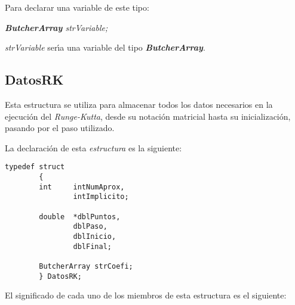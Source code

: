 Para declarar una variable de este tipo:
\begin{center}
\emph{\textbf{ButcherArray} strVariable;}
\end{center}

\emph{strVariable} ser\'{\i}a una variable del tipo 
\emph{\textbf{ButcherArray}}.

\newpage

\subsection{DatosRK} \label{sec:datosRK}

Esta estructura se utiliza para almacenar todos los datos necesarios
en la ejecuci\'on del \emph{Runge-Kutta}, desde su notaci\'on matricial
hasta su inicializaci\'on, pasando por el paso utilizado.\newline

La declaraci\'on de esta \emph{estructura} es la siguiente:

\begin{verbatim}
typedef struct
        {	
        int     intNumAprox,
                intImplicito;
	        
        double  *dblPuntos,
                dblPaso,
                dblInicio,
                dblFinal;

        ButcherArray strCoefi;
        } DatosRK;
\end{verbatim}

El significado de cada uno de los miembros de esta estructura es el
siguiente:

